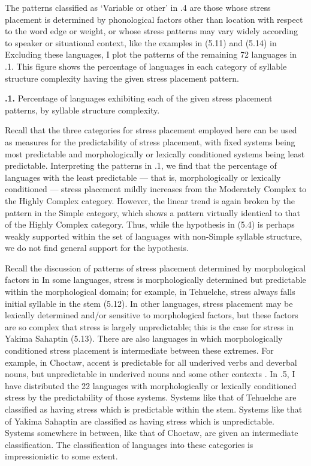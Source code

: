   The patterns classified as ‘Variable or other’ in .4 are those whose stress placement is determined by phonological factors other than location with respect to the word edge or weight, or whose stress patterns may vary widely according to speaker or situational context, like the examples in (5.11) and (5.14) in  Excluding these languages, I plot the patterns of the remaining 72 languages in .1. This figure shows the percentage of languages in each category of syllable structure complexity having the given stress placement pattern.





\textbf{.1.} Percentage of languages exhibiting each of the given stress placement patterns, by syllable structure complexity.



  Recall that the three categories for stress placement employed here can be used as measures for the predictability of stress placement, with fixed systems being most predictable and morphologically or lexically conditioned systems being least predictable. Interpreting the patterns in .1, we find that the percentage of languages with the least predictable — that is, morphologically or lexically conditioned — stress placement mildly increases from the Moderately Complex to the Highly Complex category. However, the linear trend is again broken by the pattern in the Simple category, which shows a pattern virtually identical to that of the Highly Complex category. Thus, while the hypothesis in (5.4) is perhaps weakly supported within the set of languages with non-Simple syllable structure, we do not find general support for the hypothesis.



  Recall the discussion of patterns of stress placement determined by morphological factors in  In some languages, stress is morphologically determined but predictable within the morphological domain; for example, in Tehuelche, stress always falls initial syllable in the stem (5.12). In other languages, stress placement may be lexically determined and/or sensitive to morphological factors, but these factors are so complex that stress is largely unpredictable; this is the case for stress in Yakima Sahaptin (5.13). There are also languages in which morphologically conditioned stress placement is intermediate between these extremes. For example, in Choctaw, accent is predictable for all underived verbs and deverbal nouns, but unpredictable in underived nouns and some other contexts \citep{Broadwell2006}. In .5, I have distributed the 22 languages with morphologically or lexically conditioned stress by the predictability of those systems. Systems like that of Tehuelche are classified as having stress which is predictable within the stem. Systems like that of Yakima Sahaptin are classified as having stress which is unpredictable. Systems somewhere in between, like that of Choctaw, are given an intermediate classification. The classification of languages into these categories is impressionistic to some extent.






